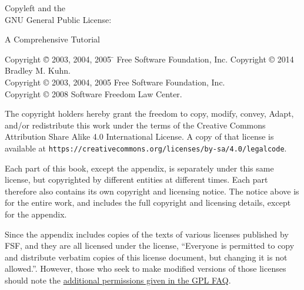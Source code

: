 \documentclass[10pt, letterpaper, openany, oneside]{book}
\begin{document}
\pagestyle{plain}

\frontmatter

\begin{titlepage}

\begin{center}

{\Huge
{\sc Copyleft and the  \\

GNU General Public License:

\vspace{.25in}

A Comprehensive Tutorial
}}
\vfill

{\parindent 0in
\begin{tabbing}
Copyright \= \copyright{} 2003, 2004, 2005 \= \hspace{.2in} Free Software Foundation, Inc. \kill 
Copyright \> \copyright{} 2014 \> \hspace{.2in} Bradley M. Kuhn. \\
Copyright \> \copyright{} 2003, 2004, 2005 \> \hspace{.2in} Free Software Foundation, Inc. \\
Copyright \> \copyright{} 2008 \> \hspace{.2in} Software Freedom Law Center. \\
\end{tabbing}
\vspace{.3in}

The copyright holders hereby grant the freedom to copy, modify, convey,
Adapt, and/or redistribute this work under the terms of the Creative Commons
Attribution Share Alike 4.0 International License.  A copy of that license is
available at \verb=https://creativecommons.org/licenses/by-sa/4.0/legalcode=.

Each part of this book, except the appendix, is separately under this same
license, but copyrighted by different entities at different times.  Each part
therefore also contains its own copyright and licensing notice.  The notice
above is for the entire work, and includes the full copyright and licensing
details, except for the appendix.

Since the appendix includes copies of the texts of various licenses published
by FSF, and they are all licensed under the license, ``Everyone is permitted
to copy and distribute verbatim copies of this license document, but changing
it is not allowed.''.  However, those who seek to make modified versions of
those licenses should note the
\href{https://www.gnu.org/licenses/gpl-faq.html#ModifyGPL}{additional
  permissions given in the GPL FAQ}.

}
\end{center}

\end{titlepage}
\end{document}
